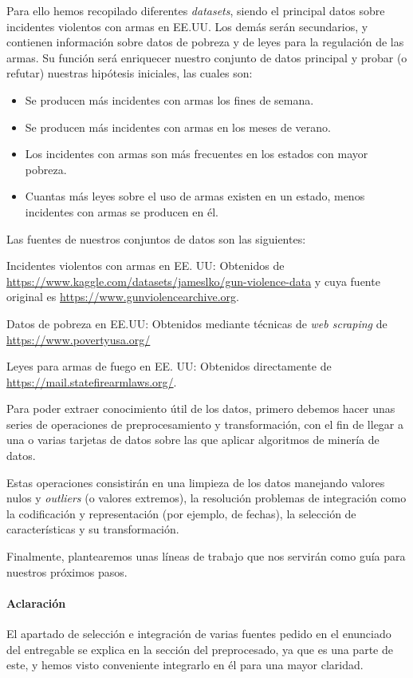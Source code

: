 \documentclass[11pt,a4paper]{article}
\begin{document}
Para ello hemos recopilado diferentes \textit{datasets}, siendo el principal datos sobre incidentes violentos con armas en EE.UU. Los demás serán secundarios, y contienen información sobre datos de pobreza y de leyes para la regulación de las armas. Su función será enriquecer nuestro conjunto de datos principal y probar (o refutar) nuestras hipótesis iniciales, las cuales son:

\begin{itemize}
    \item Se producen más incidentes con armas los fines de semana.
    \item Se producen más incidentes con armas en los meses de verano.
    \item Los incidentes con armas son más frecuentes en los estados con mayor pobreza.
    \item Cuantas más leyes sobre el uso de armas existen en un estado, menos incidentes con armas se producen en él.
\end{itemize}

Las fuentes de nuestros conjuntos de datos son las siguientes:

    Incidentes violentos con armas en EE. UU: Obtenidos de \url{https://www.kaggle.com/datasets/jameslko/gun-violence-data} y cuya fuente original es \url{https://www.gunviolencearchive.org}.

    Datos de pobreza en EE.UU: Obtenidos mediante técnicas de \textit{web scraping} de \url{https://www.povertyusa.org/}

    Leyes para armas de fuego en EE. UU: Obtenidos directamente de \url{https://mail.statefirearmlaws.org/}.

Para poder extraer conocimiento útil de los datos, primero debemos hacer unas series de operaciones de preprocesamiento y transformación, con el fin de llegar a una o varias tarjetas de datos sobre las que aplicar algoritmos de minería de datos.

Estas operaciones consistirán en una limpieza de los datos manejando valores nulos y \textit{outliers} (o valores extremos), la resolución problemas de integración como la codificación y representación (por ejemplo, de fechas), la selección de características y su transformación.

Finalmente, plantearemos unas líneas de trabajo que nos servirán como guía para nuestros próximos pasos. 

\paragraph{Aclaración} El apartado de selección e integración de varias fuentes pedido en el enunciado del entregable se explica en la sección del preprocesado, ya que es una parte de este, y hemos visto conveniente integrarlo en él para una mayor claridad.
\end{document}
